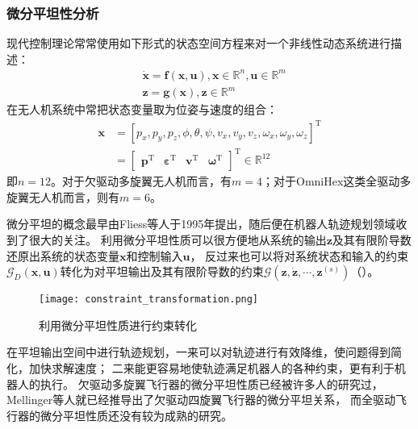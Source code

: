 \subsubsection{微分平坦性分析}\label{subsubsec:flatness_analysis}
现代控制理论常常使用如下形式的状态空间方程来对一个非线性动态系统进行描述：
\begin{align}
    &\dot{\bm{x}} = \bm{f}(\bm{x}, \bm{u}), \bm{x} \in \mathbb{R}^n, \bm{u} \in \mathbb{R}^m \label{equ:state_equation} \\
    &\bm{z} = \bm{g}(\bm{x}), \bm{z} \in \mathbb{R}^m \label{equ:output_equation}
\end{align}
在无人机系统中常把状态变量取为位姿与速度的组合：
\begin{equation}
    \begin{aligned}
        \bm{x} &= [p_x,p_y,p_z,\phi,\theta,\psi,v_x,v_y,v_z,\omega_x, \omega_y,\omega_z]^{\text{T}} \\
               &= 
               \begin{bmatrix}
                   \bm{p}^{\text{T}} & \bm{\varepsilon}^{\text{T}} & \bm{v}^{\text{T}} & \bm{\omega}^{\text{T}}
               \end{bmatrix}^{\text{T}} \in \mathbb{R}^{12}
    \end{aligned}
    \label{equ:uav_state}
\end{equation}
即$n=12$。对于欠驱动多旋翼无人机而言，有$m=4$；对于OmniHex这类全驱动多旋翼无人机而言，则有$m=6$。

微分平坦的概念最早由Fliess等人于1995年提出\cite{fliess1995flatness}，随后便在机器人轨迹规划领域收到了很大的关注。
利用微分平坦性质可以很方便地从系统的输出$\bm{z}$及其有限阶导数还原出系统的状态变量$\bm{x}$和控制输入$\bm{u}$，
反过来也可以将对系统状态和输入的约束$\mathcal{G}_D(\bm{x}, \bm{u})$转化为对平坦输出及其有限阶导数的约束$\mathcal{G}(\bm{z}, \dot{\bm{z}}, \cdots, \bm{z}^{(s)})$（）。
\begin{figure}[ht]
    \centering
    \texttt{[image: constraint\_transformation.png]}
    \caption{利用微分平坦性质进行约束转化}
    \label{fig:constraint_transformation}
\end{figure}
在平坦输出空间中进行轨迹规划，一来可以对轨迹进行有效降维，使问题得到简化，加快求解速度；
二来能更容易地使轨迹满足机器人的各种约束，更有利于机器人的执行。
欠驱动多旋翼飞行器的微分平坦性质已经被许多人的研究过，Mellinger等人就已经推导出了欠驱动四旋翼飞行器的微分平坦关系\cite{2011minimumsnap}，
而全驱动飞行器的微分平坦性质还没有较为成熟的研究。

